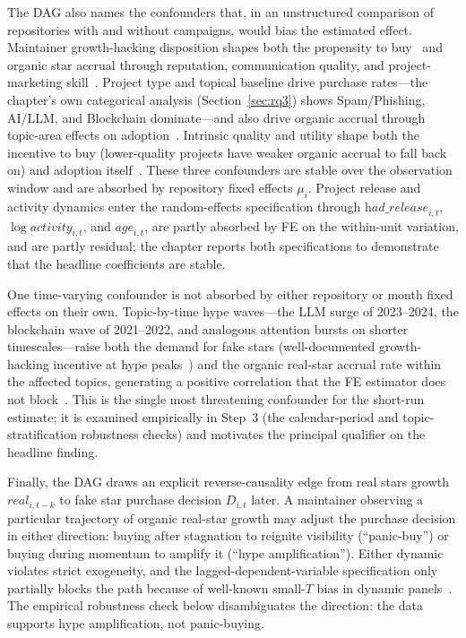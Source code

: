 The DAG also names the confounders that, in an unstructured comparison of repositories with and without campaigns, would bias the estimated effect.
Maintainer growth-hacking disposition shapes both the propensity to buy~\cite{bohnsack2019hack, startup-stars, DBLP:conf/imc/StringhiniWEKVZZ13, DBLP:conf/ccs/GrierTPZ10} and organic star accrual through reputation, communication quality, and project-marketing skill~\cite{DBLP:conf/icse/TsayDH14, DBLP:conf/cscw/DabbishSTH12}.
Project type and topical baseline drive purchase rates---the chapter's own categorical analysis (Section~\ref{sec:rq3}) shows Spam/Phishing, AI/LLM, and Blockchain dominate---and also drive organic accrual through topic-area effects on adoption~\cite{DBLP:journals/jss/BorgesV18, DBLP:journals/ese/MunaiahKCN17}.
Intrinsic quality and utility shape both the incentive to buy (lower-quality projects have weaker organic accrual to fall back on) and adoption itself~\cite{DBLP:conf/icse/TrockmanZKV18}.
These three confounders are stable over the observation window and are absorbed by repository fixed effects $\mu_i$.
Project release and activity dynamics enter the random-effects specification through $\textit{had\_release}_{i,t}$, $\log\textit{activity}_{i,t}$, and $\textit{age}_{i,t}$, are partly absorbed by FE on the within-unit variation, and are partly residual; the chapter reports both specifications to demonstrate that the headline coefficients are stable.

One time-varying confounder is not absorbed by either repository or month fixed effects on their own.
Topic-by-time hype waves---the LLM surge of 2023--2024, the blockchain wave of 2021--2022, and analogous attention bursts on shorter timescales---raise both the demand for fake stars (well-documented growth-hacking incentive at hype peaks~\cite{startup-stars, bohnsack2019hack}) and the organic real-star accrual rate within the affected topics, generating a positive correlation that the FE estimator does not block~\cite{schueller2024modeling, faris2017partisanship}.
This is the single most threatening confounder for the short-run estimate; it is examined empirically in Step~3 (the calendar-period and topic-stratification robustness checks) and motivates the principal qualifier on the headline finding.

Finally, the DAG draws an explicit reverse-causality edge from  real stars growth $\textit{real}_{i, t-k}$ to fake star purchase decision $D_{i,t}$ later.
A maintainer observing a particular trajectory of organic real-star growth may adjust the purchase decision in either direction: buying after stagnation to reignite visibility (``panic-buy'') or buying during momentum to amplify it (``hype amplification'').
Either dynamic violates strict exogeneity, and the lagged-dependent-variable specification only partially blocks the path because of well-known small-$T$ bias in dynamic panels~\cite{nickell1981biases}.
The empirical robustness check below disambiguates the direction: the data supports hype amplification, not panic-buying.

